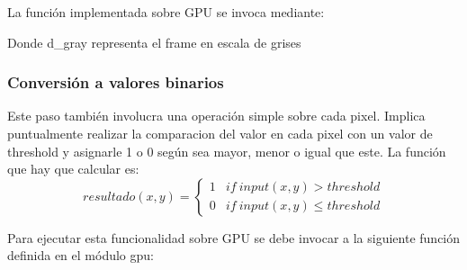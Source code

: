 \documentclass[a4paper,10pt]{report}
\begin{document}
La función implementada sobre GPU se invoca mediante:

 \begin{center}
\end{center}

Donde d\_gray representa el frame en escala de grises



 \subsubsection{Conversión a valores binarios}
 Este paso también involucra una operación simple sobre cada pixel. 
 Implica puntualmente realizar la comparacion del valor en cada pixel con un valor de threshold y asignarle 1 o 0 según sea mayor, menor o igual que este.
 La función que hay que calcular es: 
 \begin{displaymath}
   resultado(x,y) = \left\{
     \begin{array}{lr}
       1 &  if\ input(x,y) > threshold\\
       0 &  if\ input(x,y) \leq threshold
     \end{array}
   \right.
\end{displaymath} 


Para ejecutar esta funcionalidad sobre GPU se debe invocar a la siguiente función definida en el módulo gpu: 
 \begin{center}
\end{center}
\end{document}
